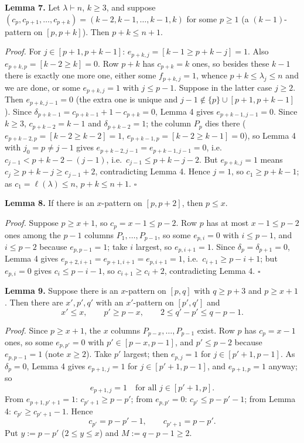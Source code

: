 \documentclass[11pt,a4paper]{article}
\begin{document}
\textbf{Lemma 7.} Let \(\lambda\vdash n\), \(k\ge3\), and suppose
\((c_p,c_{p+1},\dots,c_{p+k})=(k-2,k-1,\dots,k-1,k)\) for some \(p\ge1\)
(a \((k-1)\)-pattern on \([p,p+k]\)). Then \(p+k\le n+1\).

\emph{Proof.} For \(j\in[p+1,p+k-1]\): \(e_{p+k,j}=[k-1\ge p+k-j]=1\).
Also \(e_{p+k,p}=[k-2\ge k]=0\). Row \(p+k\) has \(c_{p+k}=k\) ones, so
besides these \(k-1\) there is exactly one more one, either some
\(f_{p+k,j}=1\), whence \(p+k\le\lambda_j\le n\) and we are done, or
some \(e_{p+k,j}=1\) with \(j\le p-1\). Suppose in the latter case
\(j\ge2\). Then \(e_{p+k,j-1}=0\) (the extra one is unique and
\(j-1\notin\{p\}\cup[p+1,p+k-1]\)). Since
\(\delta_{p+k-1}=c_{p+k-1}+1-c_{p+k}=0\), Lemma 4 gives
\(e_{p+k-1,j-1}=0\). Since \(k\ge3\), \(c_{p+k-2}=k-1\) and
\(\delta_{p+k-2}=1\); the column \(P_p\) dies there
(\(e_{p+k-2,p}=[k-2\ge k-2]=1\), \(e_{p+k-1,p}=[k-2\ge k-1]=0\)), so
Lemma 4 with \(j_0=p\ne j-1\) gives \(e_{p+k-2,j-1}=e_{p+k-1,j-1}=0\),
i.e.~\(c_{j-1}<p+k-2-(j-1)\), i.e.~\(c_{j-1}\le p+k-j-2\). But
\(e_{p+k,j}=1\) means \(c_j\ge p+k-j\ge c_{j-1}+2\), contradicting Lemma
4. Hence \(j=1\), so \(c_1\ge p+k-1\); as \(c_1=\ell(\lambda)\le n\),
\(p+k\le n+1\). \(\square\)

\textbf{Lemma 8.} If there is an \(x\)-pattern on \([p,p+2]\), then
\(p\le x\).

\emph{Proof.} Suppose \(p\ge x+1\), so \(c_p=x-1\le p-2\). Row \(p\) has
at most \(x-1\le p-2\) ones among the \(p-1\) columns
\(P_1,\dots,P_{p-1}\), so some \(e_{p,i}=0\) with \(i\le p-1\), and
\(i\le p-2\) because \(e_{p,p-1}=1\); take \(i\) largest, so
\(e_{p,i+1}=1\). Since \(\delta_p=\delta_{p+1}=0\), Lemma 4 gives
\(e_{p+2,i+1}=e_{p+1,i+1}=e_{p,i+1}=1\), i.e.~\(c_{i+1}\ge p-i+1\); but
\(e_{p,i}=0\) gives \(c_i\le p-i-1\), so \(c_{i+1}\ge c_i+2\),
contradicting Lemma 4. \(\square\)

\textbf{Lemma 9.} Suppose there is an \(x\)-pattern on \([p,q]\) with
\(q\ge p+3\) and \(p\ge x+1\). Then there are \(x',p',q'\) with an
\(x'\)-pattern on \([p',q']\) and
\[x'\le x,\qquad p'\ge p-x,\qquad 2\le q'-p'\le q-p-1.\]

\emph{Proof.} Since \(p\ge x+1\), the \(x\) columns
\(P_{p-x},\dots,P_{p-1}\) exist. Row \(p\) has \(c_p=x-1\) ones, so some
\(e_{p,p'}=0\) with \(p'\in[p-x,p-1]\), and \(p'\le p-2\) because
\(e_{p,p-1}=1\) (note \(x\ge2\)). Take \(p'\) largest; then
\(e_{p,j}=1\) for \(j\in[p'+1,p-1]\). As \(\delta_p=0\), Lemma 4 gives
\(e_{p+1,j}=1\) for \(j\in[p'+1,p-1]\), and \(e_{p+1,p}=1\) anyway; so
\[e_{p+1,j}=1\quad\text{for all }j\in[p'+1,p].\tag{9.1}\] From
\(e_{p+1,p'+1}=1\): \(c_{p'+1}\ge p-p'\); from \(e_{p,p'}=0\):
\(c_{p'}\le p-p'-1\); from Lemma 4: \(c_{p'}\ge c_{p'+1}-1\). Hence
\[c_{p'}=p-p'-1,\qquad c_{p'+1}=p-p'.\tag{9.2}\] Put \(y:=p-p'\)
(\(2\le y\le x\)) and \(M:=q-p-1\ge2\).
\end{document}
